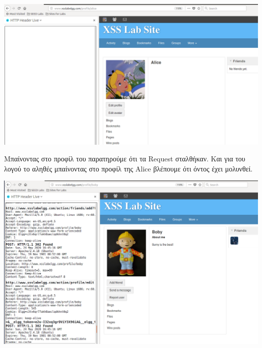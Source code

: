 \begin{center}
			\includegraphics[width=1\textwidth]{image/6.7.PNG}		
\end{center}

\noindent
Μπαίνοντας στο προφίλ του παρατηρούμε ότι τα Request σταλθήκαν. Και για 
του λογού το αληθές μπαίνοντας στο προφίλ της Alice βλέπουμε ότι όντος
έχει μολυνθεί.


\begin{center}
			\includegraphics[width=1\textwidth]{image/6.8.PNG}		
\end{center}
\noindent



